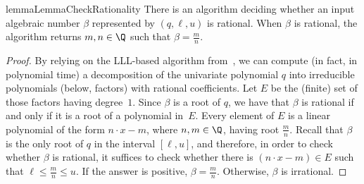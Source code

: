 \begin{restatable}{lemma}{LemmaCheckRationality}
  \label{lemma:check-rationality}
  There is an algorithm deciding whether an input algebraic number $\beta$ 
  represented by $(q,\ell,u)$ is rational.
  When $\beta$ is rational, the algorithm returns $m,n \in \Q$ such that 
  $\beta = \frac{m}{n}$.
\end{restatable}

\begin{proof}
  By relying on the LLL-based algorithm from~\cite{lenstra1982}, 
  we can compute (in fact, in polynomial time)
  a decomposition of the univariate polynomial $q$ into 
  irreducible polynomials (below, factors) with rational coefficients. 
  Let $E$ be the (finite) set of those factors having degree~$1$. 
  Since $\beta$ is a root of $q$, we have that $\beta$ is rational if and only if it is a root of a polynomial in~$E$.
  Every element of $E$ is a linear polynomial of the form $n \cdot x - m$, where $n,m \in \Q$, having root $\frac{m}{n}$. 
  Recall that $\beta$ is the only root of $q$ in the interval $[\ell,u]$, and therefore, in order to check whether $\beta$ is rational, 
  it suffices to check whether there is $(n \cdot x - m) \in E$
  such that $\ell \leq \frac{m}{n} \leq u$. If the answer is positive, $\beta = \frac{m}{n}$. Otherwise, $\beta$ is irrational. 
\end{proof}

\LemmaRepresentationPowerOfAlgebraic*

